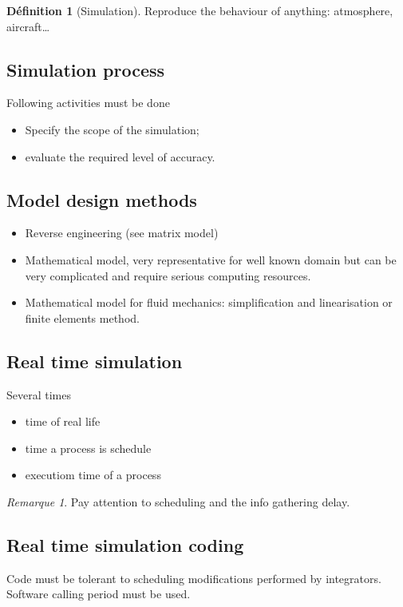 \documentclass[10pt]{article}
\theoremstyle{plain}
\theoremstyle{definition}
\newtheorem{defn}{Définition}
\theoremstyle{remark}
\newtheorem{rem}{Remarque}
\begin{document}
\begin{defn}
	[Simulation]
	Reproduce the behaviour of anything: atmosphere, aircraft\dots
\end{defn}

\subsection{Simulation process}
Following activities must be done
\begin{itemize}
	\item Specify the scope of the simulation;
	\item evaluate the required level of accuracy.
\end{itemize}

\subsection{Model design methods}
\begin{itemize}
	\item Reverse engineering (see matrix model)
	\item Mathematical model, very representative for well known domain but can
		be very complicated and require serious computing resources.
	\item Mathematical model for fluid mechanics: simplification and
		linearisation or finite elements method.
\end{itemize}

\subsection{Real time simulation}
Several times
\begin{itemize}
	\item time of real life
	\item time a process is schedule
	\item executiom time of a process
\end{itemize}
\begin{rem}
	Pay attention to scheduling and the info gathering delay.
\end{rem}

\subsection{Real time simulation coding}
Code must be tolerant to scheduling modifications performed by integrators.
Software calling period must be used.
\end{document}
